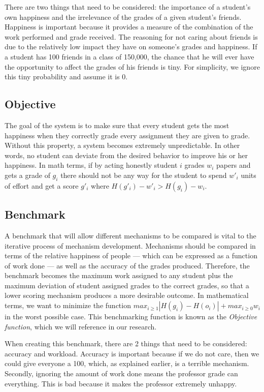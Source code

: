 \documentclass[12pt, Arial]{article}
\begin{document}
There are two things that need to be considered: the importance of a student's own happiness and the irrelevance of the grades of a given student's friends. Happiness is important because it provides a measure of the combination of the work performed and grade received. The reasoning for not caring about friends is due to the relatively low impact they have on someone's grades and happiness. If a student has 100 friends in a class of 150,000, the chance that he will ever have the opportunity to affect the grades of his friends is tiny. For simplicity, we ignore this tiny probability and assume it is 0.

\subsection{Objective}
The goal of the system is to make sure that every student gets the most happiness when they correctly grade every assignment they are given to grade. Without this property, a system becomes extremely unpredictable. In other words, no student can deviate from the desired behavior to improve his or her happiness. In math terms, if by acting honestly student $i$ grades $w_i$ papers and gets a grade of $g_i$ there should not be any way for the student to spend $w'_i$ units of effort and get a score $g'_i$ where $H(g'_i)-w'_i > H(g_i)-w_i$.

\subsection{Benchmark}
A benchmark that will allow different mechanisms to be compared is vital to the iterative process of mechanism development. Mechanisms should be compared in terms of the relative happiness of people --- which can be expressed as a function of work done --- as well as the accuracy of the grades produced. Therefore, the benchmark becomes the maximum work assigned to any student plus the maximum deviation of student assigned grades to the correct grades, so that a lower scoring mechanism produces a more desirable outcome. In mathematical terms, we want to minimize the function $max_{i \ge 1} |H(g_i)-H(o_i)| + max_{i \ge 0} w_i$ in the worst possible case. This benchmarking function is known as the \emph{Objective function}, which we will reference in our research.

When creating this benchmark, there are 2 things that need to be considered: accuracy and workload. Accuracy is important because if we do not care, then we could give everyone a 100, which, as explained earlier, is a terrible mechanism. Secondly, ignoring the amount of work done means the professor grade can everything. This is bad because it makes the professor extremely unhappy.
\end{document}
